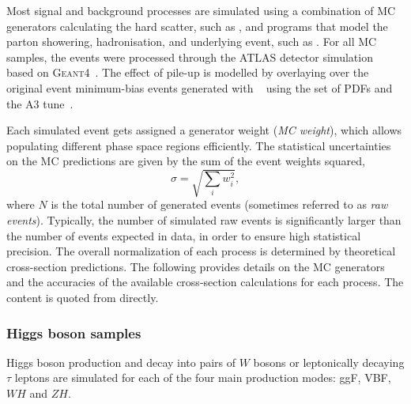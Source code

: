 Most signal and background processes are simulated using a combination of MC generators calculating the hard scatter, such as \Powheg, and programs that model the parton showering, hadronisation, and underlying event, such as \PythiaEight.
For all MC samples, the events were processed through the ATLAS detector simulation~\cite{SOFT-2010-01} based on
\textsc{Geant4}~\cite{Agostinelli:2002hh}.\cite{PLACEHOLDER:FOR:PAPER} 
The effect of pile-up is modelled by overlaying over the original event minimum-bias events generated with ~\cite{Sjostrand:2007gs} using the \nnpdftwo set of PDFs and the A3 tune~\cite{ATL-PHYS-PUB-2016-017}.


Each simulated event gets assigned a generator weight (\emph{MC weight}), which allows populating different phase space regions efficiently.
The statistical uncertainties on the MC predictions are given by the sum of the event weights squared,
\begin{equation}
    \sigma = \sqrt{\sum_i w_i^2},
\end{equation}
where $N$ is the total number of generated events (sometimes referred to as \emph{raw events}). Typically, the number of simulated raw events is significantly larger than the number of events expected in data, in order to ensure high statistical precision. 
The overall normalization of each process is determined by theoretical cross-section predictions.
The following provides details on the MC generators and the accuracies of the available cross-section calculations for each process. The content is quoted from \cite{PLACEHOLDER:FOR:PAPER} directly.


\subsubsection{Higgs boson samples}
Higgs boson production and decay into pairs of $W$ bosons or leptonically decaying $\tau$ leptons are simulated for each of the four main production modes: ggF, VBF, $WH$ and $ZH$.

